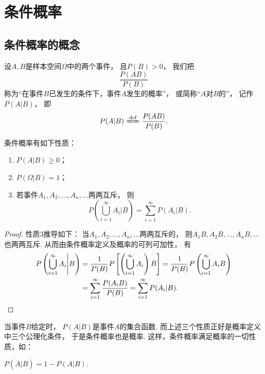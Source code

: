 \section{条件概率}
\subsection{条件概率的概念}
\begin{definition}\label{definition:条件概率.条件概率的概念}
设\(A,B\)是样本空间\(\Omega\)中的两个事件，
且\(P(B) > 0\)，
我们把\[
	\frac{P(AB)}{P(B)}
\]称为“在事件\(B\)已发生的条件下，事件\(A\)发生的概率”，
或简称“\(A\)对\(B\)的”，
记作\(P(A \vert B)\)，
即\begin{equation}
	P(A \vert B)
	\defeq
	\frac{P(AB)}{P(B)}.
\end{equation}
\end{definition}

\begin{property}
条件概率有如下性质：
\begin{enumerate}
	\item \(P(A \vert B) \geq 0\)；

	\item \(P(\Omega \vert B) = 1\)；

	\item 若事件\(A_1,A_2,\dotsc,A_n,\dotsc\)两两互斥，
	则\[
		P\left(\bigcup_{i=1}^\infty A_i \Bigg\vert B\right)
		= \sum_{i=1}^\infty {P(A_i \vert B)}.
	\]
\end{enumerate}
\begin{proof}
性质3推导如下：
当\(A_1,A_2,\dotsc,A_n,\dotsc\)两两互斥的，
则\(A_1 B,A_2 B,\dotsc,A_n B,\dotsc\)也两两互斥.
从而由条件概率定义及概率的可列可加性，
有\begin{align*}
	P\left(\bigcup_{i=1}^\infty A_i \Bigg\vert B\right)
	&= \frac{1}{P(B)} P\left[\left(\displaystyle\bigcup_{i=1}^\infty A_i\right) B\right]
	= \frac{1}{P(B)} P\left(\displaystyle\bigcup_{i=1}^\infty {A_i B}\right) \\
	&= \sum_{i=1}^\infty {\frac{P(A_i B)}{P(B)}}
	= \sum_{i=1}^\infty {P(A_i \vert B)}.
	\qedhere
\end{align*}
\end{proof}
\end{property}

当事件\(B\)给定时，
\(P(A \vert B)\)是事件\(A\)的集合函数.
而上述三个性质正好是概率定义中三个公理化条件，
于是条件概率也是概率.
这样，条件概率满足概率的一切性质，如：

\begin{property}
\(P(\overline{A} \vert B)
= 1 - P(A \vert B)\).
\end{property}

